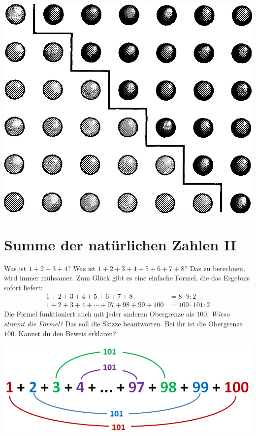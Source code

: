 \documentclass[a5paper,ngerman,landscape,11pt]{scrartcl}
\begin{document}
\vfill
\begin{center}
\includegraphics[scale=0.3]{kleiner-gauss-1}
\end{center}


\section*{Summe der natürlichen Zahlen II}
Was ist $1 + 2 + 3 + 4$? Was ist $1 + 2 + 3 + 4 + 5 + 6 + 7 + 8$? Das zu
berechnen, wird immer mühsamer. Zum Glück gibt es eine einfache Formel, die das
Ergebnis sofort liefert:
\begin{align*}
  1 + 2 + 3 + 4 + 5 + 6 + 7 + 8 &= 8 \cdot 9 : 2 \\
  1 + 2 + 3 + 4 + \cdots + 97 + 98 + 99 + 100 &= 100 \cdot 101 : 2
\end{align*}
Die Formel funktioniert auch mit jeder anderen Obergrenze als $100$. \emph{Wieso
stimmt die Formel?} Das soll die Skizze beantworten. Bei ihr ist die
Obergrenze~$100$. Kannst du den Beweis erklären?
\begin{center}
\includegraphics[scale=0.7]{kleiner-gauss-2}
\end{center}
\end{document}
